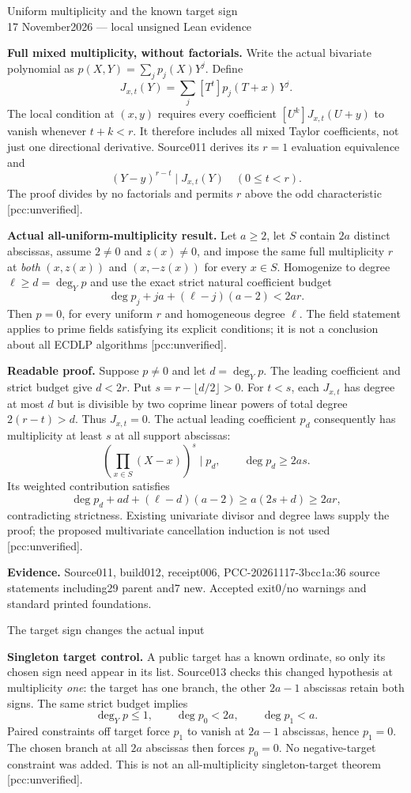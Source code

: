 \documentclass[10pt]{article}
\begin{document}
\begin{center}{\Large Uniform multiplicity and the known target sign}\\[4pt]
17 November2026 --- local unsigned Lean evidence\end{center}
\textbf{Full mixed multiplicity, without factorials.} Write the actual
bivariate polynomial as $p(X,Y)=\sum_j p_j(X)Y^j$. Define
\[
 J_{x,t}(Y)=\sum_j [T^t]p_j(T+x)\,Y^j.
\]
The local condition at $(x,y)$ requires every coefficient
$[U^k]J_{x,t}(U+y)$ to vanish whenever $t+k<r$. It therefore includes
all mixed Taylor coefficients, not just one directional derivative.
Source011 derives its $r=1$ evaluation equivalence and
\[
 (Y-y)^{r-t}\mid J_{x,t}(Y)\quad(0\le t<r).
\]
The proof divides by no factorials and permits $r$ above the odd characteristic
[pcc:unverified].

\textbf{Actual all-uniform-multiplicity result.} Let $a\ge2$, let $S$ contain
$2a$ distinct abscissas, assume $2\ne0$ and $z(x)\ne0$, and impose the same
full multiplicity $r$ at \emph{both} $(x,z(x))$ and $(x,-z(x))$ for every
$x\in S$. Homogenize to degree $\ell\ge d=\deg_Yp$ and use the exact strict
natural coefficient budget
\[
 \deg p_j+ja+(\ell-j)(a-2)<2ar.
\]
Then $p=0$, for every uniform $r$ and homogeneous degree $\ell$. The field
statement applies to prime fields satisfying its explicit conditions; it
is not a conclusion about all ECDLP algorithms [pcc:unverified].

\textbf{Readable proof.} Suppose $p\ne0$ and let $d=\deg_Yp$.
The leading coefficient and strict budget give $d<2r$. Put
$s=r-\lfloor d/2\rfloor>0$. For $t<s$, each $J_{x,t}$ has degree at most $d$
but is divisible by two coprime linear powers of total degree $2(r-t)>d$.
Thus $J_{x,t}=0$. The actual leading coefficient $p_d$ consequently has
multiplicity at least $s$ at all support abscissas:
\[
 \left(\prod_{x\in S}(X-x)\right)^s\mid p_d,
 \qquad \deg p_d\ge2as.
\]
Its weighted contribution satisfies
\[
 \deg p_d+ad+(\ell-d)(a-2)\ge a(2s+d)\ge2ar,
\]
contradicting strictness. Existing univariate divisor and degree laws supply
the proof; the proposed multivariate cancellation induction is not used
[pcc:unverified].

\textbf{Evidence.} Source011, build012, receipt006,
PCC-20261117-3bcc1a:36 source statements including29 parent and7 new.
Accepted exit0/no warnings and standard printed foundations.
\newpage
\begin{center}{\Large The target sign changes the actual input}\end{center}
\textbf{Singleton target control.} A public target has a known ordinate,
so only its chosen sign need appear in its list. Source013 checks this changed
hypothesis at multiplicity \emph{one}: the target has one branch, the other
$2a-1$ abscissas retain both signs. The same strict budget implies
\[
 \deg_Yp\le1,\qquad \deg p_0<2a,\qquad \deg p_1<a.
\]
Paired constraints off target force $p_1$ to vanish at $2a-1$ abscissas, hence
$p_1=0$. The chosen branch at all $2a$ abscissas then forces $p_0=0$.
No negative-target constraint was added. This is not an all-multiplicity
singleton-target theorem [pcc:unverified].
\end{document}
